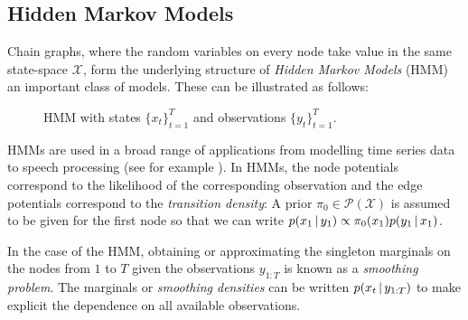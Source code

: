 \subsection{Hidden Markov Models}
Chain graphs, where the random variables on every node take value in the same state-space $\mathcal X$, form the underlying structure of \emph{Hidden Markov Models} (HMM) an important class of models. These can be illustrated as follows:
\begin{figure}[!h]
\center
{}
\caption{\label{fig: hmm1} HMM with states $\{x_{t}\}_{t=1}^{T}$ and observations $\{y_{t}\}_{t=1}^{T}$.}
\end{figure}

HMMs are used in a broad range of applications from modelling time series data to speech processing (see for example \citet{ghahramani01, gales07, zucchini16}). In HMMs, the node potentials correspond to the likelihood of the corresponding observation and the edge potentials correspond to the \emph{transition density}:
A prior $\pi_{0}\in\mathcal P(\mathcal X)$ is assumed to be given for the first node so that we can write $p(x_1\,|\, y_{1}) \propto \pi_{0}(x_1)p(y_1\,|\, x_1)$. 

In the case of the HMM, obtaining or approximating the singleton marginals on the nodes from $1$ to $T$ given the observations $y_{1:T}$ is known as a \emph{smoothing problem}. The marginals or \emph{smoothing densities} can be written $p(x_t\,|\, y_{1:T})$ to make explicit the dependence on all available observations.

